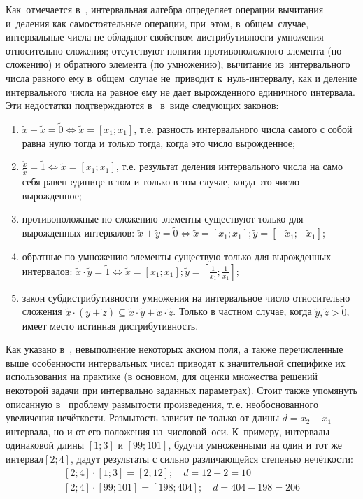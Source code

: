Как~отмечается в~\cite{Pospelov, Sokolov}, интервальная алгебра определяет операции вычитания и~деления как самостоятельные операции, при~этом, в~общем~случае, интервальные числа не обладают свойством дистрибутивности умножения относительно сложения; отсутствуют понятия противоположного элемента (по сложению) и обратного элемента (по умножению); вычитание из~интервального числа равного ему в~общем~случае не~приводит к~нуль-интервалу, как и деление интервального числа на равное ему не дает вырожденного единичного интервала. Эти недостатки подтверждаются в~\cite{Levin} в~виде следующих законов:
\begin{enumerate}
	\item $\tilde{x}-\tilde{x}=\tilde{0}\Leftrightarrow \tilde{x}=\left[ {{x}_{1}};{{x}_{1}} \right]$, т.е. разность интервального числа самого с собой равна нулю тогда и только тогда, когда это число вырожденное;
	\item $\displaystyle \frac{{\tilde{x}}}{{\tilde{x}}}=\tilde{1}\Leftrightarrow \tilde{x}=\left[ {{x}_{1}};{{x}_{1}} \right]$, т.е. результат деления интервального числа на само себя равен единице в том и только в том случае, когда это число вырожденное;
	\item противоположные по сложению элементы существуют только для вырожденных интервалов: $\tilde{x}+\tilde{y}=\tilde{0}\Leftrightarrow \tilde{x}=\left[ {{x}_{1}};{{x}_{1}} \right];\tilde{y}=\left[ -{{{\tilde{x}}}_{1}};-{{{\tilde{x}}}_{1}} \right]$;
	\item обратные по умножению элементы существую только для вырожденных интервалов: $\displaystyle \tilde{x}\cdot \tilde{y}=\tilde{1}\Leftrightarrow \tilde{x}=\left[ {{x}_{1}};{{x}_{1}} \right];\tilde{y}=\left[ \frac{1}{{{x}_{1}}};\frac{1}{x_1} \right]$;
	\item закон субдистрибутивности умножения на интервальное число относительно сложения $\tilde{x}\cdot \left( \tilde{y}+\tilde{z} \right)\subseteq \tilde{x}\cdot \tilde{y}+\tilde{x}\cdot \tilde{z}$. Только в частном случае, когда $\tilde y,\tilde z>\tilde 0$, имеет место истинная дистрибутивность.
\end{enumerate}

Как указано в~\cite{Levin}, невыполнение некоторых аксиом поля, а также перечисленные выше особенности интервальных чисел приводят к значительной специфике их использования на практике (в основном, для оценки множества решений некоторой задачи при интервально заданных параметрах). Стоит также упомянуть описанную в~\cite{Spesivtsev, Yakhyaeva} проблему размытости произведения, т.\,е. необоснованного увеличения нечёткости. Размытость зависит не только от длины $d={{x}_{2}}-{{x}_{1}}$ интервала, но и от его положения на~числовой~оси. К~примеру, интервалы одинаковой длины $\left[ 1;3 \right]$ и $\left[ 99;101 \right]$, будучи умноженными на один и тот же интервал$\left[ 2;4 \right]$, дадут результаты с сильно различающейся степенью нечёткости:
\[
	\begin{matrix}
		\left[ 2;4 \right]\cdot \left[ 1;3 \right]=\left[ 2;12 \right];\quad d=12-2=10 \\ 
		\left[ 2;4 \right]\cdot \left[ 99;101 \right]=\left[ 198;404 \right];\quad d=404-198=206 
	\end{matrix}
\]

